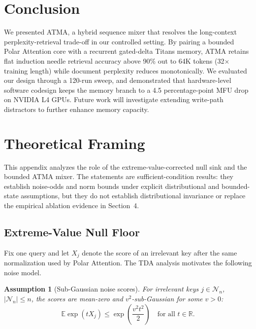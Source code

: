 \documentclass{article} %
\newtheorem{assumption}{Assumption}
\begin{document}
\section{Conclusion}
We presented ATMA, a hybrid sequence mixer that resolves the long-context perplexity-retrieval trade-off in our controlled setting. By pairing a bounded Polar Attention core with a recurrent gated-delta Titans memory, ATMA retains flat induction needle retrieval accuracy above 90\% out to 64K tokens (32$\times$ training length) while document perplexity reduces monotonically. We evaluated our design through a 120-run sweep, and demonstrated that hardware-level software codesign keeps the memory branch to a 4.5 percentage-point MFU drop on NVIDIA L4 GPUs. Future work will investigate extending write-path distractors to further enhance memory capacity.




\appendix

\clearpage
\section{Theoretical Framing}
\label{appendix:theory}

This appendix analyzes the role of the extreme-value-corrected null sink and the bounded
ATMA mixer. The statements are sufficient-condition results: they establish noise-odds and
norm bounds under explicit distributional and bounded-state assumptions, but they do not
establish distributional invariance or replace the empirical ablation evidence in Section~4.

\subsection{Extreme-Value Null Floor}

Fix one query and let $X_j$ denote the score of an irrelevant key after the same normalization
used by Polar Attention. The TDA analysis motivates the following noise model.

\begin{assumption}[Sub-Gaussian noise scores]
For irrelevant keys $j \in \mathcal{N}_n$, $|\mathcal{N}_n| \le n$, the scores are mean-zero
and $v^2$-sub-Gaussian for some $v>0$:
\begin{equation}
    \mathbb{E}\exp(tX_j) \le \exp\left(\frac{v^2 t^2}{2}\right)
    \quad \text{for all } t \in \mathbb{R}.
\end{equation}
\end{assumption}
\end{document}
